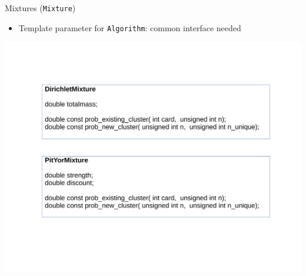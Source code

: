 \begin{frame}{Mixtures (\texttt{Mixture})}

\begin{itemize}
	\item Template parameter for \texttt{Algorithm}: common interface needed
\end{itemize}

\begin{center}
	\includegraphics[scale=0.35]{etc/mixture.pdf}
\end{center}

\end{frame}